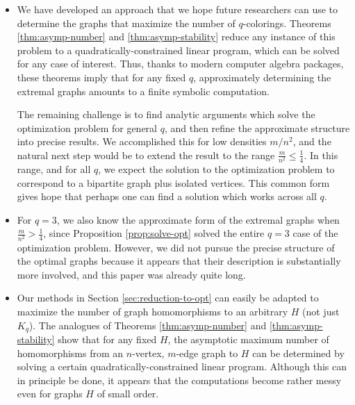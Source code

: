 \documentclass[11pt]{article}
\begin{document}
\begin{itemize}
\item We have developed an approach that we hope future researchers
  can use to determine the graphs that maximize the number of
  $q$-colorings.  Theorems \ref{thm:asymp-number} and
  \ref{thm:asymp-stability} reduce any instance of this problem to a
  quadratically-constrained linear program, which can be solved for
  any case of interest.  Thus, thanks to modern computer algebra
  packages, these theorems imply that for any fixed $q$, approximately
  determining the extremal graphs amounts to a finite symbolic
  computation.

  The remaining challenge is to find analytic arguments which solve
  the optimization problem for general $q$, and then refine the
  approximate structure into precise results.  We accomplished this
  for low densities $m/n^2$, and the natural next step would be to
  extend the result to the range $\frac{m}{n^2} \leq \frac{1}{4}$.  In
  this range, and for all $q$, we expect the solution to the
  optimization problem to correspond to a bipartite graph plus
  isolated vertices.  This common form gives hope that perhaps one can
  find a solution which works across all $q$.


\item For $q=3$, we also know the approximate form of the extremal
  graphs when $\frac{m}{n^2} > \frac{1}{4}$, since Proposition
  \ref{prop:solve-opt} solved the entire $q=3$ case of the
  optimization problem.  However, we did not pursue the precise
  structure of the optimal graphs because it appears that their
  description is substantially more involved, and this paper was
  already quite long.






\item Our methods in Section \ref{sec:reduction-to-opt} can easily be
  adapted to maximize the number of graph homomorphisms to an
  arbitrary $H$ (not just $K_q$).  The analogues of Theorems
  \ref{thm:asymp-number} and \ref{thm:asymp-stability} show that for
  any fixed $H$, the asymptotic maximum number of homomorphisms from
  an $n$-vertex, $m$-edge graph to $H$ can be determined by solving a
  certain quadratically-constrained linear program.  Although this can
  in principle be done, it appears that the computations become rather
  messy even for graphs $H$ of small order.


\end{itemize}
\end{document}
